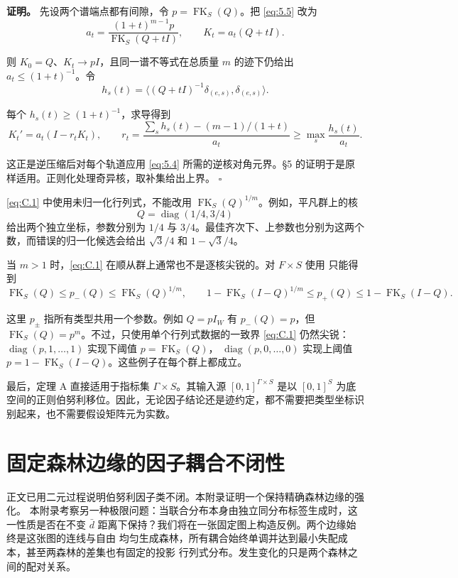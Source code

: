 \documentclass[UTF8,zihao=-4,a4paper]{ctexart}
\numberwithin{equation}{section}
\begin{document}
\textbf{证明。} 先设两个谱端点都有间隙，令
\(p=\operatorname{FK}_S(Q)\)。把 \eqref{eq:5.5} 改为
\[
a_t=\frac{(1+t)^{m-1}p}{\operatorname{FK}_S(Q+tI)},\qquad
K_t=a_t(Q+tI).
\]

则 \(K_0=Q\)、\(K_t\to pI\)，且同一谱不等式在总质量 \(m\) 的迹下仍给出
\(a_t\le(1+t)^{-1}\)。令
\[
h_s(t)=\langle(Q+tI)^{-1}\delta_{(e,s)},\delta_{(e,s)}\rangle.
\]

每个 \(h_s(t)\ge(1+t)^{-1}\)，求导得到
\[
K_t'=a_t(I-r_tK_t),\qquad
r_t=\frac{\sum_s h_s(t)-(m-1)/(1+t)}{a_t}
\ge\max_s\frac{h_s(t)}{a_t}.
\tag{C.2}\label{eq:C.2}
\]

这正是逆压缩后对每个轨道应用 \eqref{eq:5.4} 所需的逆核对角元界。\S{}5 的证明于是原样适用。正则化处理奇异核，取补集给出上界。 \(\square\)

\eqref{eq:C.1} 中使用未归一化行列式，不能改用
\(\operatorname{FK}_S(Q)^{1/m}\)。例如，平凡群上的核
\[
Q=\operatorname{diag}(1/4,3/4)
\]
给出两个独立坐标，参数分别为 \(1/4\) 与 \(3/4\)。最佳齐次下、上参数也分别为这两个数，而错误的归一化候选会给出
\(\sqrt3/4\) 和 \(1-\sqrt3/4\)。

当 \(m>1\) 时，\eqref{eq:C.1} 在顺从群上通常也不是逐核尖锐的。对 \(F\times S\) 使用 \cite[Theorem 1.4]{LiT} 只能得到
\[
\operatorname{FK}_S(Q)\le p_-(Q)
\le\operatorname{FK}_S(Q)^{1/m},\qquad
1-\operatorname{FK}_S(I-Q)^{1/m}
\le p_+(Q)\le1-\operatorname{FK}_S(I-Q).
\tag{C.3}\label{eq:C.3}
\]

这里 \(p_\pm\) 指所有类型共用一个参数。例如
\(Q=pI_W\) 有 \(p_-(Q)=p\)，但
\(\operatorname{FK}_S(Q)=p^m\)。不过，只使用单个行列式数据的一致界 \eqref{eq:C.1} 仍然尖锐：
\(\operatorname{diag}(p,1,\ldots,1)\) 实现下阈值
\(p=\operatorname{FK}_S(Q)\)，
\(\operatorname{diag}(p,0,\ldots,0)\) 实现上阈值
\(p=1-\operatorname{FK}_S(I-Q)\)。这些例子在每个群上都成立。

最后，定理 A 直接适用于指标集 \(\Gamma\times S\)。其输入源 \([0,1]^{\Gamma\times S}\) 是以
\([0,1]^S\) 为底空间的正则伯努利移位。因此，无论因子结论还是迹约定，都不需要把类型坐标识别起来，也不需要假设矩阵元为实数。

\clearpage
\section{固定森林边缘的因子耦合不闭性}\label{sec:forest}

正文已用二元过程说明伯努利因子类不闭。本附录证明一个保持精确森林边缘的强化。
本附录考察另一种极限问题：当联合分布本身由独立同分布标签生成时，这一性质是否在不变
$\bar d$ 距离下保持？我们将在一张固定图上构造反例。两个边缘始终是这张图的连线与自由
均匀生成森林，所有耦合始终单调并达到最小失配成本，甚至两森林的差集也有固定的投影
行列式分布。发生变化的只是两个森林之间的配对关系。
\end{document}
